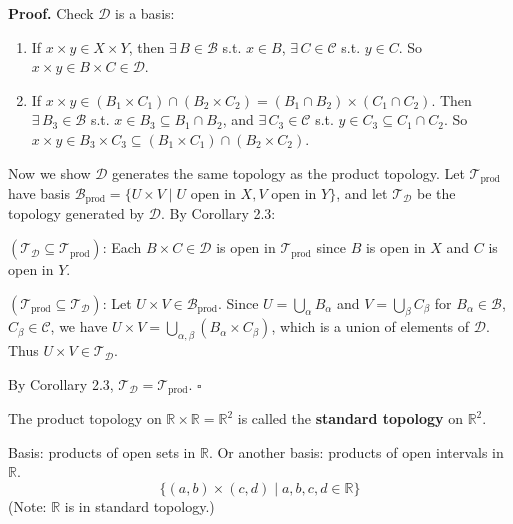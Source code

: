 \documentclass[11pt]{report}
\renewenvironment{proof}[1][Proof]{\noindent\textbf{#1.} }{\hfill$\square$\par\vspace{5pt}}
\begin{document}
\begin{proof}
Check $\mathcal{D}$ is a basis:
\begin{enumerate}
    \item If $x \times y \in X \times Y$, then $\exists\, B \in \mathcal{B}$ s.t. $x \in B$, $\exists\, C \in \mathcal{C}$ s.t. $y \in C$. So $x \times y \in B \times C \in \mathcal{D}$.
    \item If $x \times y \in (B_1 \times C_1) \cap (B_2 \times C_2) = (B_1 \cap B_2) \times (C_1 \cap C_2)$. Then $\exists\, B_3 \in \mathcal{B}$ s.t. $x \in B_3 \subseteq B_1 \cap B_2$, and $\exists\, C_3 \in \mathcal{C}$ s.t. $y \in C_3 \subseteq C_1 \cap C_2$. So $x \times y \in B_3 \times C_3 \subseteq (B_1 \times C_1) \cap (B_2 \times C_2)$.
\end{enumerate}

Now we show $\mathcal{D}$ generates the same topology as the product topology. Let $\mathcal{T}_{\text{prod}}$ have basis $\mathcal{B}_{\text{prod}} = \{U \times V \mid U \text{ open in } X, V \text{ open in } Y\}$, and let $\mathcal{T}_{\mathcal{D}}$ be the topology generated by $\mathcal{D}$. By Corollary 2.3:

$(\mathcal{T}_{\mathcal{D}} \subseteq \mathcal{T}_{\text{prod}})$: Each $B \times C \in \mathcal{D}$ is open in $\mathcal{T}_{\text{prod}}$ since $B$ is open in $X$ and $C$ is open in $Y$.

$(\mathcal{T}_{\text{prod}} \subseteq \mathcal{T}_{\mathcal{D}})$: Let $U \times V \in \mathcal{B}_{\text{prod}}$. Since $U = \bigcup_\alpha B_\alpha$ and $V = \bigcup_\beta C_\beta$ for $B_\alpha \in \mathcal{B}$, $C_\beta \in \mathcal{C}$, we have $U \times V = \bigcup_{\alpha, \beta} (B_\alpha \times C_\beta)$, which is a union of elements of $\mathcal{D}$. Thus $U \times V \in \mathcal{T}_{\mathcal{D}}$.

By Corollary 2.3, $\mathcal{T}_{\mathcal{D}} = \mathcal{T}_{\text{prod}}$.
\end{proof}

\begin{exbox}
The product topology on $\mathbb{R} \times \mathbb{R} = \mathbb{R}^2$ is called the \textbf{standard topology} on $\mathbb{R}^2$.

Basis: products of open sets in $\mathbb{R}$. Or another basis: products of open intervals in $\mathbb{R}$.
\[\{(a,b) \times (c,d) \mid a, b, c, d \in \mathbb{R}\}\]
(Note: $\mathbb{R}$ is in standard topology.)
\end{exbox}
\end{document}

